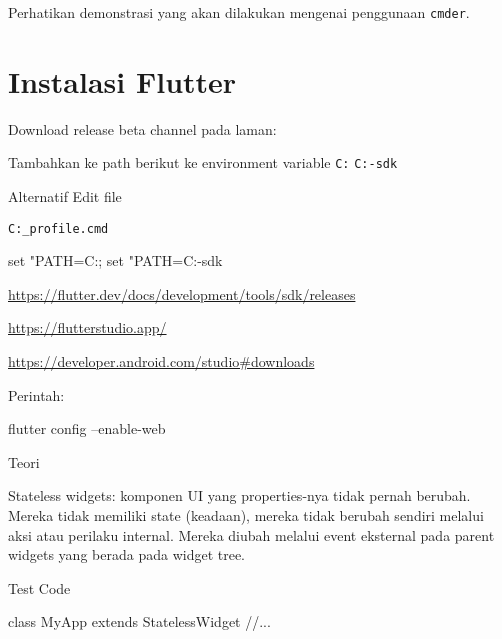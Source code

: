 \documentclass[a4paper,11pt]{article} %
\newcommand{\txtinline}[1]{\texttt{#1}}
\begin{document}
Perhatikan demonstrasi yang akan dilakukan mengenai penggunaan \txtinline{cmder}.

\section{Instalasi Flutter}

Download release beta channel pada laman:


Tambahkan ke path berikut ke environment variable
\txtinline{C:\Users\jendela\flutter\bin}
\txtinline{C:\Users\jendela\flutter\bin\cache\dart-sdk\bin}

Alternatif
Edit file
\begin{textcode}
\txtinline{C:\Users\jendela\cmder\config\user_profile.cmd}
\end{textcode}

\begin{textcode}
set "PATH=C:\Users\jendela\flutter\bin;%
set "PATH=C:\Users\jendela\flutter\bin\cache\dart-sdk\bin
\end{textcode}


{\footnotesize\url{https://flutter.dev/docs/development/tools/sdk/releases}}

{\footnotesize\url{https://flutterstudio.app/}}

{\footnotesize\url{https://developer.android.com/studio#downloads}}

Perintah:

\begin{textcode}
flutter config --enable-web
\end{textcode}

Teori

Stateless widgets: komponen UI yang properties-nya tidak pernah berubah.
Mereka tidak memiliki state (keadaan), mereka tidak berubah sendiri melalui
aksi atau perilaku internal. Mereka diubah melalui event eksternal pada parent widgets
yang berada pada widget tree.


Test Code
\begin{dartcode}
class MyApp extends StatelessWidget {
  //...
}
\end{dartcode}





\end{document}
